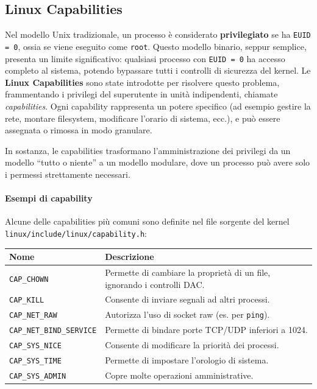 \subsection{Linux Capabilities}
Nel modello Unix tradizionale, un processo è considerato \textbf{privilegiato} se ha \texttt{EUID = 0}, ossia se viene eseguito come \texttt{root}.
Questo modello binario, seppur semplice, presenta un limite significativo: qualsiasi processo con \texttt{EUID = 0} ha accesso completo al sistema, potendo bypassare tutti i controlli di sicurezza del kernel.
Le \textbf{Linux Capabilities} sono state introdotte per risolvere questo problema, frammentando i privilegi del superutente in unità indipendenti, chiamate \textit{capabilities}.
Ogni capability rappresenta un potere specifico (ad esempio gestire la rete, montare filesystem, modificare l’orario di sistema, ecc.), e può essere assegnata o rimossa in modo granulare.

In sostanza, le capabilities trasformano l’amministrazione dei privilegi da un modello “tutto o niente” a un modello modulare, dove un processo può avere solo i permessi strettamente necessari.

\paragraph{Esempi di capability}
Alcune delle capabilities più comuni sono definite nel file sorgente del kernel \texttt{linux/include/linux/capability.h}:
\begin{center}
\begin{tabular}{ll}
\toprule
\textbf{Nome} & \textbf{Descrizione} \\
\midrule
\texttt{CAP\_CHOWN} & Permette di cambiare la proprietà di un file, ignorando i controlli DAC. \\
\texttt{CAP\_KILL} & Consente di inviare segnali ad altri processi. \\
\texttt{CAP\_NET\_RAW} & Autorizza l’uso di socket raw (es. per \texttt{ping}). \\
\texttt{CAP\_NET\_BIND\_SERVICE} & Permette di bindare porte TCP/UDP inferiori a 1024. \\
\texttt{CAP\_SYS\_NICE} & Consente di modificare la priorità dei processi. \\
\texttt{CAP\_SYS\_TIME} & Permette di impostare l’orologio di sistema. \\
\texttt{CAP\_SYS\_ADMIN} & Copre molte operazioni amministrative. \\
\bottomrule
\end{tabular}
\end{center}

